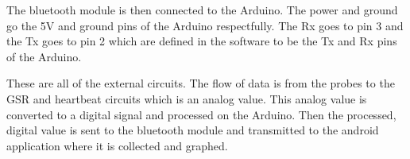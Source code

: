 \documentclass[finalProposal.tex]{subfiles}
\begin{document}
The bluetooth module is then connected to the Arduino. The power and ground go the 5V and ground pins of the Arduino respectfully. The Rx goes to pin 3 and the Tx goes to pin 2 which are defined in
the software to be the Tx and Rx pins of the Arduino.

These are all of the external circuits. The flow of data is from the probes to the GSR and heartbeat circuits which is an analog value. This analog value is converted to a digital signal and processed
on the Arduino. Then the processed, digital value is sent to the bluetooth module and transmitted to the android application where it is collected and graphed.
\end{document}
